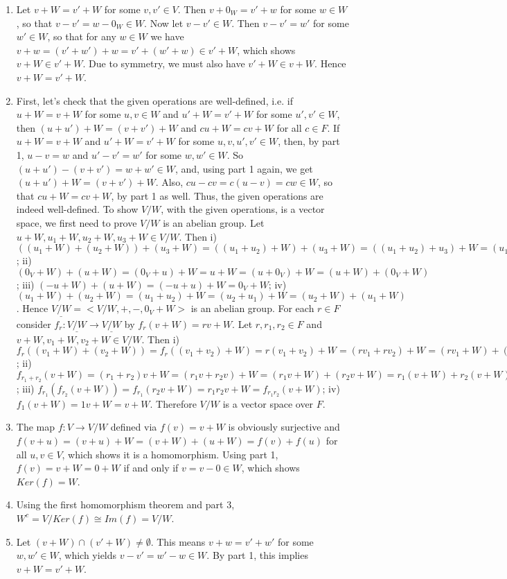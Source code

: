 \begin{solution}

\begin{enumerate}

\item Let $v+W = v'+W$ for some $v, v' \in V$. Then $v+0_W = v'+w$
for some $w \in W$, so that $v-v' = w-0_W \in W$.
\smallskip
Now let $v-v' \in W$. Then $v-v' = w'$ for some $w' \in W$, so that for
any $w \in W$ we have $v+w = (v'+w')+w = v'+(w'+w) \in v'+W$, which
shows $v+W \in v'+W$. Due to symmetry, we must also have $v'+W \in v+W$.
Hence $v+W = v'+W$.
\item First, let's check that the given operations are well-defined, i.e. if
$u+W = v+W$ for some $u,v \in W$ and $u'+W = v'+W$ for some $u',v' \in W$,
then $(u+u')+W = (v+v')+W$ and $cu+W = cv+W$ for all $c \in F$.
\smallskip
If $u+W = v+W$ and $u'+W = v'+W$ for some $u,v,u',v' \in W$, then, by part 1,
$u-v = w$ and $u'-v' = w'$ for some $w, w' \in W$. So $(u+u')-(v+v') = w+w' \in W$,
and, using part 1 again, we get $(u+u')+W = (v+v')+W$. Also, $cu-cv = c(u-v) = cw \in W$,
so that $cu+W = cv+W$, by part 1 as well. Thus, the given operations are indeed well-defined.
\smallskip
To show $V/W$, with the given operations, is a vector space, we first need to prove $V/W$
is an abelian group.
\smallskip
Let $u+W, u_1+W, u_2+W, u_3+W \in V/W$. Then
\smallskip
i) $((u_1+W)+(u_2+W))+(u_3+W) = ((u_1+u_2)+W)+(u_3+W) =
((u_1+u_2)+u_3)+W = (u_1+(u_2+u_3))+W = (u_1+W)+((u_2+u_3)+ W) =
(u_1+W)+((u_2+W)+(u_3+W))$;
\smallskip
ii) $(0_V+W)+(u+W) = (0_V+u)+W = u+W = (u+0_V)+W = (u+W)+(0_V+W)$;
\smallskip
iii) $(-u+W)+(u+W) = (-u+u)+W = 0_V+W$;
\smallskip
iv) $(u_1+W)+(u_2+W) = (u_1+u_2)+W = (u_2+u_1)+W = (u_2+W)+(u_1+W)$.
\smallskip
Hence $\underline{V/W}=<V/W,+,-,0_V+W>$ is an abelian group.
\smallskip
For each $r \in F$ consider $f_r: \underline{V/W} \rightarrow \underline{V/W}$ by $f_r(v+W)=rv+W$. 
\smallskip
Let $r, r_1, r_2 \in F$ and $v+W, v_1+W, v_2+W \in V/W$. Then
\smallskip
i) $f_r((v_1+W)+(v_2+W))=f_r((v_1+v_2)+W)=r(v_1+v_2)+W=(rv_1+rv_2)+W=(rv_1+W)+(rv_2+W)=
r(v_1+W)+r(v_2+W)=f_r(v_1+W)+f_r(v_2+W)$;
\smallskip
ii) $f_{r_1+r_2}(v+W)=(r_1+r_2)v+W=(r_1v+r_2v)+W=(r_1v+W)+(r_2v+W)=r_1(v+W)+r_2(v+W)=
f_{r_1}(v+W)+f_{r_2}(v+W)$;
\smallskip
iii) $f_{r_1}(f_{r_2}(v+W))=f_{r_1}(r_2v+W)=r_1r_2v+W=f_{r_1r_2}(v+W)$;
\smallskip
iv) $f_1(v+W)=1v+W=v+W$.
\smallskip
Therefore $V/W$ is a vector space over $F$.
\item The map $f:V \rightarrow V/W$ defined via $f(v)=v+W$ is obviously surjective and 
$f(v+u)=(v+u)+W=(v+W)+(u+W)=f(v)+f(u)$ for all $u,v \in V$, which shows it is a homomorphism. 
Using part 1, $f(v)=v+W=0+W$ if and only if $v=v-0 \in W$, which shows $Ker(f)=W$.
\item Using the first homomorphism theorem and part 3, $W^c=V/Ker(f) \cong Im(f)=V/W$.
\item Let $(v+W)\cap (v'+W) \neq \emptyset$. This means $v+w=v'+w'$ for some $w,w' \in W$, which yields 
$v-v'=w'-w \in W$. By part 1, this implies $v+W=v'+W$.

\end{enumerate}

\end{solution}

